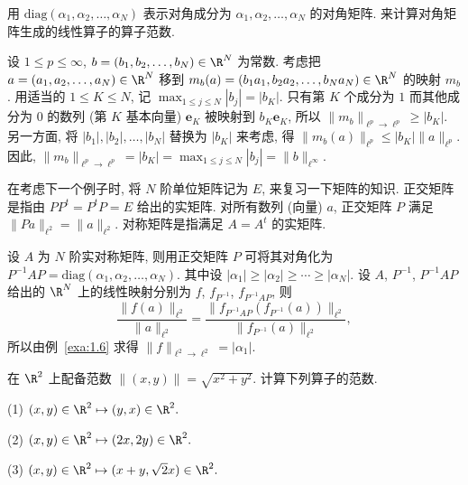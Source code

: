 用 $\mathrm{diag}(\alpha_{1}, \alpha_{2}, \ldots, \alpha_{N})$ 表示对角成分为 $\alpha_{1}, \alpha_{2}, \ldots, \alpha_{N}$ 的对角矩阵. 来计算对角矩阵生成的线性算子的算子范数.

\begin{example}\label{exa:1.6}
设 $1 \leq p \leq \infty$, $b = (b_{1}, b_{2}, \ldots, b_{N}) \in \R^{N}$ 为常数. 考虑把 $a = (a_{1}, a_{2}, \ldots, a_{N}) \in \R^{N}$ 移到 $m_{b}(a) = (b_{1}a_{1}, b_{2}a_{2}, \ldots, b_{N}a_{N}) \in \R^{N}$ 的映射 $m_{b}$. 用适当的 $1 \leq K \leq N$, 记 $\max_{1 \leq j \leq N} |b_{j}| = |b_{K}|$. 只有第 $K$ 个成分为 $1$ 而其他成分为 $0$ 的数列 (第 $K$ 基本向量) $\mathbf{e}_{K}$ 被映射到 $b_{K}\mathbf{e}_{K}$, 所以 $\|m_{b}\|_{\ell^{p} \to \ell^{p}} \geq |b_{K}|$. 另一方面, 将 $|b_{1}|, |b_{2}|, \ldots, |b_{N}|$ 替换为 $|b_{K}|$ 来考虑, 得 $\|m_{b}(a)\|_{\ell^{p}} \leq |b_{K}| \|a\|_{\ell^{p}}$. 因此, $\|m_{b}\|_{\ell^{p} \to \ell^{p}} = |b_{K}| = \max_{1 \leq j \leq N} |b_{j}| = \|b\|_{\ell^{\infty}}$.
\end{example}

在考虑下一个例子时, 将 $N$ 阶单位矩阵记为 $E$, 来复习一下矩阵的知识. 正交矩阵是指由 $PP^{t} = P^{t}P = E$ 给出的实矩阵. 对所有数列 (向量) $a$, 正交矩阵 $P$ 满足 $\|Pa\|_{\ell^{2}} = \|a\|_{\ell^{2}}$. 对称矩阵是指满足 $A = A^{t}$ 的实矩阵.

\begin{example}\label{exa:1.7}
设 $A$ 为 $N$ 阶实对称矩阵, 则用正交矩阵 $P$ 可将其对角化为 $P^{-1}AP = \mathrm{diag}(\alpha_{1}, \alpha_{2}, \ldots, \alpha_{N})$. 其中设 $|\alpha_{1}| \geq |\alpha_{2}| \geq \cdots \geq |\alpha_{N}|$. 设 $A$, $P^{-1}$, $P^{-1}AP$ 给出的 $\R^{N}$ 上的线性映射分别为 $f$, $f_{P^{-1}}$, $f_{P^{-1}AP}$, 则
\[
\frac{\| f(a) \|_{\ell^{2}}}{\| a \|_{\ell^{2}}} = \frac{\| f_{P^{-1}AP}(f_{P^{-1}}(a)) \|_{\ell^{2}}}{\| f_{P^{-1}}(a) \|_{\ell^{2}}},
\]
所以由例~\ref{exa:1.6} 求得 $\|f\|_{\ell^{2} \to \ell^{2}} = |\alpha_{1}|$.
\end{example}

\begin{exercise}\label{exer:1.10}
在 $\R^{2}$ 上配备范数 $\|(x, y)\| = \sqrt{x^{2} + y^{2}}$. 计算下列算子的范数.

(1) $(x, y) \in \R^{2} \mapsto (y, x) \in \R^{2}.$

(2) $(x, y) \in \R^{2} \mapsto (2x, 2y) \in \R^{2}.$

(3) $(x, y) \in \R^{2} \mapsto (x + y, \sqrt{2}x) \in \R^{2}.$
\end{exercise}

